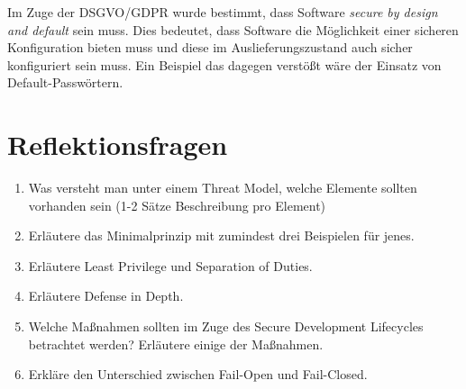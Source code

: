 Im Zuge der DSGVO/GDPR wurde bestimmt, dass Software \textit{secure by design and default} sein muss. Dies bedeutet, dass Software die Möglichkeit einer sicheren Konfiguration bieten muss und diese im Auslieferungszustand auch sicher konfiguriert sein muss. Ein Beispiel das dagegen verstößt wäre der Einsatz von Default-Passwörtern.

\section{Reflektionsfragen}

\begin{enumerate}
	\item Was versteht man unter einem Threat Model, welche Elemente sollten vorhanden sein (1-2 Sätze Beschreibung pro Element)
	\item Erläutere das Minimalprinzip mit zumindest drei Beispielen für jenes.
	\item Erläutere Least Privilege und Separation of Duties.
	\item Erläutere Defense in Depth.
	\item Welche Maßnahmen sollten im Zuge des Secure Development Lifecycles betrachtet werden? Erläutere einige der Maßnahmen.
	\item Erkläre den Unterschied zwischen Fail-Open und Fail-Closed.
\end{enumerate}
